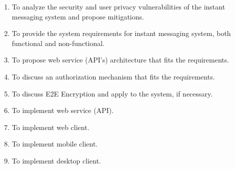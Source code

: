 \begin{enumerate}
    \item To analyze the security and user privacy vulnerabilities of the instant messaging system and propose mitigations.
    \item To provide the system requirements for instant messaging system, both functional and non-functional.
    \item To propose web service (API's) architecture that fits the requirements.
    \item To discuss an authorization mechanism that fits the requirements.
    \item To discuss E2E Encryption and apply to the system, if necessary.
    \item To implement web service (API).
    \item To implement web client.
    \item To implement mobile client.
    \item To implement desktop client.
\end{enumerate}